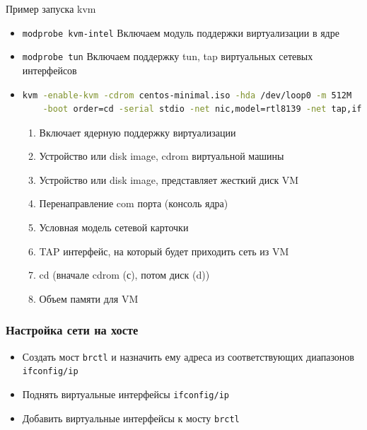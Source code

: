 \begin{frame}[fragile]{Пример запуска kvm}
		\begin{itemize}
          \item {\tt modprobe kvm-intel} {\small Включаем модуль поддержки виртуализации в ядре} 
          \item {\tt modprobe tun}  {\small Включаем поддержку tun, tap виртуальных сетевых интерфейсов}
          \item 
            \begin{lstlisting}[language=bash,basicstyle=\tiny] 
kvm -enable-kvm -cdrom centos-minimal.iso -hda /dev/loop0 -m 512M   \
    -boot order=cd -serial stdio -net nic,model=rtl8139 -net tap,ifname=tap0 
            \end{lstlisting}
              \begin{enumerate}
                \item[{\tt -enable-kvm}] Включает ядерную поддержку виртуализации
                \item[{\tt -cdrom}] Устройство или disk image, cdrom виртуальной машины
                \item[{\tt -hda}] Устройство или disk image, представляет жесткий диск VM
                \item[{\tt -serial}] Перенаправление com порта (консоль ядра)
                \item[{\tt -net nic}] Условная модель сетевой карточки
                \item[{\tt -net tap}] TAP интерфейс, на который будет приходить сеть из VM
                \item[{\tt -boot order}] cd (вначале cdrom (с), потом диск (d))
                \item[{\tt -m}] Объем памяти для VM
              \end{enumerate}
        \end{itemize}
\end{frame}        


\begin{frame}
	\frametitle{Настройка сети на хосте}
			\begin{itemize}
				\item Создать мост {\tt brctl} и назначить ему адреса из соответствующих диапазонов {\tt ifconfig/ip}
				\item Поднять виртуальные интерфейсы {\tt ifconfig/ip}
				\item Добавить виртуальные интерфейсы к мосту {\tt brctl}
			\end{itemize}
\end{frame}


